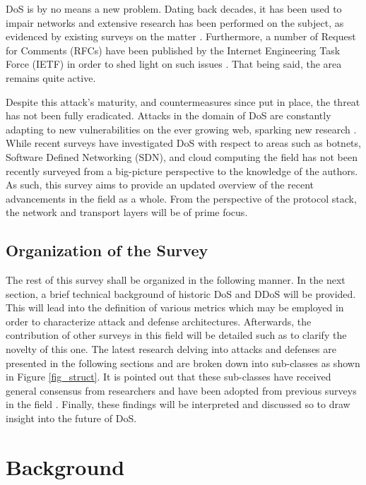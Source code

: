 \documentclass[conference]{IEEEtran}
\begin{document}
DoS is by no means a new problem. Dating back decades, it has been used to impair networks and extensive research has been performed on the subject, as evidenced by existing surveys on the matter \cite{SecuringCloudServers:Chapade,DoSTCPAnalysis:Schuba,Yan:SDNSurvey}. Furthermore, a number of Request for Comments (RFCs) have been published by the Internet Engineering Task Force (IETF) in order to shed light on such issues \cite{rfc1948,rfc6528}. That being said, the area remains quite active.

Despite this attack's maturity, and countermeasures since put in place, the threat has not been fully eradicated. Attacks in the domain of DoS are constantly adapting to new vulnerabilities on the ever growing web, sparking new research \cite{GreenhouseEffect:Marchetta, RealtimeDetection:Miao, SYNFloodDetection:Aborujilah}. While recent surveys have investigated DoS with respect to areas such as botnets, Software Defined Networking (SDN), and cloud computing the field has not been recently surveyed from a big-picture perspective to the knowledge of the authors. As such, this survey aims to provide an updated overview of the recent advancements in the field as a whole. From the perspective of the protocol stack, the network and transport layers will be of prime focus. 

\subsection{Organization of the Survey}
The rest of this survey shall be organized in the following manner. In the next section, a brief technical background of historic DoS and DDoS will be provided. This will lead into the definition of various metrics which may be employed in order to characterize attack and defense architectures. Afterwards, the contribution of other surveys in this field will be detailed such as to clarify the novelty of this one. The latest research delving into attacks and defenses are presented in the following sections and are broken down into sub-classes as shown in Figure \ref{fig_struct}. It is pointed out that these sub-classes have received general consensus from researchers and have been adopted from previous surveys in the field \cite{Botnet:Hoque,Zargar:DDOSFlood}. Finally, these findings will be interpreted and discussed so to draw insight into the future of DoS.

\section{Background}
\end{document}
